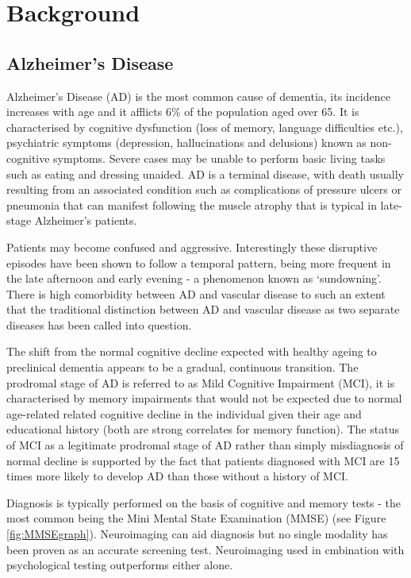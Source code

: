 \chapter{Background}
\section{Alzheimer's Disease}
Alzheimer's Disease (AD) is the most common cause of dementia, its incidence increases with age and it afflicts 6\% of the population aged over 65. \cite{Burns2009} It is characterised by cognitive dysfunction (loss of memory, language difficulties etc.), psychiatric symptoms (depression, hallucinations and delusions) known as non-cognitive symptoms. Severe cases may be unable to perform basic living tasks such as eating and dressing unaided. AD is a terminal disease, with death usually resulting from an associated condition such as complications of pressure ulcers or pneumonia that can manifest following the muscle atrophy that is typical in late-stage Alzheimer's patients.\cite{Burns2009}

Patients may become confused and aggressive. Interestingly these disruptive episodes have been shown to follow a temporal pattern, being more frequent in the late afternoon and early evening - a phenomenon known as `sundowning'. \cite{McCann2004} There is high comorbidity between AD and vascular disease to such an extent that the traditional distinction between AD and vascular disease as two separate diseases has been called into question.\cite{Stewart2002}

The shift from the normal cognitive decline expected with healthy ageing to preclinical dementia appears to be a gradual, continuous transition. The prodromal stage of AD is referred to as Mild Cognitive Impairment (MCI), it is characterised by memory impairments that would not be expected due to normal age-related related cognitive decline in the individual given their age and educational history (both are strong correlates for memory function). The status of MCI as a legitimate prodromal stage of AD rather than simply misdiagnosis of normal decline is supported by the fact that patients diagnosed with MCI are 15 times more likely to develop AD than those without a history of MCI.\cite{Burns2009}

Diagnosis is typically performed on the basis of cognitive and memory tests - the most common being the Mini Mental State Examination (MMSE) (see Figure \ref{fig:MMSEgraph}). Neuroimaging can aid diagnosis but no single modality has been proven as an accurate screening test. Neuroimaging used in cmbination with psychological testing outperforms either alone.\cite{Burns2009}


